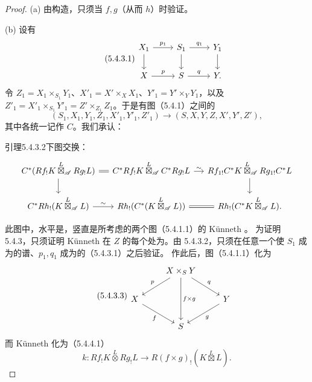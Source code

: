 \begin{proof}
(a) 由构造，只须当 $f,g$（从而 $h$）时验证。

(b) 设有
\begin{equation}\tag{5.4.3.1}\begin{tikzcd}
X_1\arrow[r,"p_1"]\arrow[d]&S_1\arrow[r,"q_1"]\arrow[d]&Y_1\arrow[d]\\
X\arrow[r,"p"]&S\arrow[r,"q"]&Y .
\end{tikzcd}\end{equation}
令 $Z_1=X_1\times_{S_1}Y_1$、$X'_1=X'\times_X X_1$、$Y'_1=Y'\times_Y Y_1$，以及 $Z'_1=X'_1\times_{S_1}Y'_1=Z'\times_{Z_1}Z_1$。于是有图（5.4.1）之间的
\[(S_1,X_1,Y_1,Z_1,X'_1,Y'_1,Z'_1)\longrightarrow(S,X,Y,Z,X',Y',Z'),\]
其中各统一记作 $C$。我们承认：
\begin{SGAresult}{引理}{5.4.3.2}下图交换：
\[\begin{tikzcd}[column sep=small]
C^*(Rf_!K\overset L\boxtimes_{\mathscr A}Rg_!L)\arrow[r,equal]\arrow[d]&C^*Rf_!K\overset L\boxtimes_{\mathscr A}C^*Rg_!L\arrow[r,"\sim"]&Rf_{1!}C^*K\overset L\boxtimes_{\mathscr A}Rg_{1!}C^*L\arrow[d]\\
C^*Rh_!(K\overset L\boxtimes_{\mathscr A}L)\arrow[r,"\sim"]&Rh_!(C^*(K\overset L\boxtimes_{\mathscr A}L))\arrow[r,equal]&Rh_!(C^*K\overset L\boxtimes_{\mathscr A}L).
\end{tikzcd}\]
\end{SGAresult}
此图中，水平是，竖直是所考虑的两个图（5.4.1.1）的 Künneth 。
为证明 5.4.3，只须证明 Künneth 在 $Z$ 的每个处为。由 5.4.3.2，只须在任意一个使 $S_1$ 成为的谱、$p_1,q_1$ 成为的（5.4.3.1）之后验证。
作此后，图（5.4.1.1）化为
\begin{equation}\tag{5.4.3.3}\begin{tikzcd}
&X\times_S Y\arrow[dl,"p"']\arrow[dr,"q"]\arrow[dd,"f\times g"]&\\
X\arrow[dr,"f"']&&Y\arrow[dl,"g"]\\&S&
\end{tikzcd}\end{equation}
而 Künneth 化为（5.4.4.1）
\begin{equation}\tag{5.4.3.4}k:Rf_!K\overset L\otimes Rg_!L\longrightarrow R(f\times g)_!(K\overset L\boxtimes L).\end{equation}

\end{proof}

